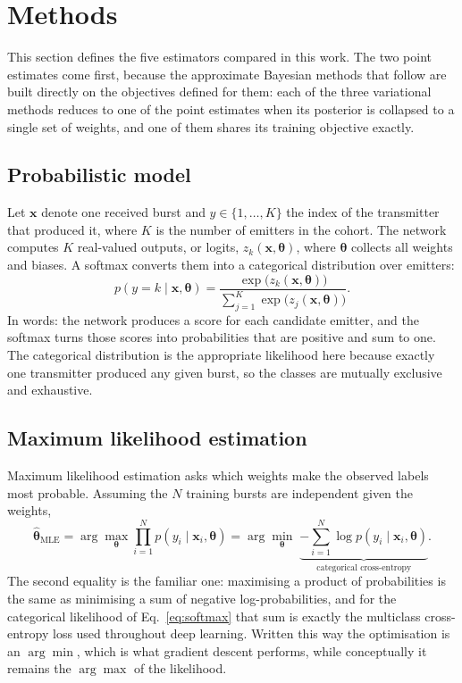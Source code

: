 \documentclass{article}
\begin{document}
\section{Methods}

This section defines the five estimators compared in this work. The two point
estimates come first, because the approximate Bayesian methods that follow are
built directly on the objectives defined for them: each of the three variational
methods reduces to one of the point estimates when its posterior is collapsed to
a single set of weights, and one of them shares its training objective exactly.

\subsection{Probabilistic model}

Let $\mathbf{x}$ denote one received burst and $y \in \{1,\dots,K\}$ the index of
the transmitter that produced it, where $K$ is the number of emitters in the
cohort. The network computes $K$ real-valued outputs, or logits,
$z_k(\mathbf{x}, \boldsymbol{\theta})$, where $\boldsymbol{\theta}$ collects all
weights and biases. A softmax converts them into a categorical distribution over
emitters:
\begin{equation}
p(y = k \mid \mathbf{x}, \boldsymbol{\theta})
= \frac{\exp\!\big(z_k(\mathbf{x}, \boldsymbol{\theta})\big)}
       {\sum_{j=1}^{K} \exp\!\big(z_j(\mathbf{x}, \boldsymbol{\theta})\big)}.
\label{eq:softmax}
\end{equation}
In words: the network produces a score for each candidate emitter, and the
softmax turns those scores into probabilities that are positive and sum to one.
The categorical distribution is the appropriate likelihood here because exactly
one transmitter produced any given burst, so the classes are mutually exclusive
and exhaustive.

\subsection{Maximum likelihood estimation}

Maximum likelihood estimation asks which weights make the observed labels most
probable. Assuming the $N$ training bursts are independent given the weights,
\begin{equation}
\hat{\boldsymbol{\theta}}_{\mathrm{MLE}}
= \arg\max_{\boldsymbol{\theta}} \prod_{i=1}^{N} p(y_i \mid \mathbf{x}_i, \boldsymbol{\theta})
= \arg\min_{\boldsymbol{\theta}} \; \underbrace{-\sum_{i=1}^{N} \log p(y_i \mid \mathbf{x}_i, \boldsymbol{\theta})}_{\text{categorical cross-entropy}}.
\label{eq:mle}
\end{equation}
The second equality is the familiar one: maximising a product of probabilities
is the same as minimising a sum of negative log-probabilities, and for the
categorical likelihood of Eq.~\eqref{eq:softmax} that sum is exactly the
multiclass cross-entropy loss used throughout deep learning. Written this way
the optimisation is an $\arg\min$, which is what gradient descent performs,
while conceptually it remains the $\arg\max$ of the likelihood.
\end{document}
